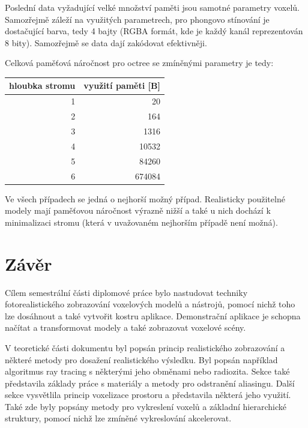 Poslední data vyžadující velké množství paměti jsou samotné parametry voxelů. Samozřejmě záleží na využitých parametrech, pro phongovo stínování je dostačující barva, tedy 4 bajty (RGBA formát, kde je každý kanál reprezentován 8 bity). Samozřejmě se data dají zakódovat efektivněji.

Celková paměťová náročnost pro octree se zmíněnými parametry je tedy:

\begin{table}[H]
\centering
\begin{tabular}{|r|r|}
\hline
\multicolumn{1}{|c|}{hloubka stromu} & \multicolumn{1}{c|}{využití paměti {[}B{]}} \\ \hline
1                                    & 20                                          \\ \hline
2                                    & 164                                         \\ \hline
3                                    & 1316                                        \\ \hline
4                                    & 10532                                       \\ \hline
5                                    & 84260                                       \\ \hline
6                                    & 674084                                      \\ \hline
\end{tabular}
\end{table}

Ve všech případech se jedná o nejhorší možný případ. Realisticky použitelné modely mají paměťovou náročnost výrazně nižší a také u nich dochází k minimalizaci stromu (která v uvažovaném nejhorším případě není možná).


\chapter{Závěr}
\label{zaver}
Cílem semestrální části diplomové práce bylo nastudovat techniky fotorealistického zobrazování voxelových modelů a nástrojů, pomocí nichž toho lze dosáhnout a také vytvořit kostru aplikace. Demonstrační aplikace je schopna načítat a transformovat modely a také zobrazovat voxelové scény.

V teoretické části dokumentu byl popsán princip realistického zobrazování a některé metody pro dosažení realistického výsledku. Byl popsán například algoritmus ray tracing s některými jeho obměnami nebo radiozita. Sekce také představila základy práce s materiály a metody pro odstranění aliasingu. Další sekce vysvětlila princip voxelizace prostoru a představila některá jeho využití. Také zde byly popsány metody pro vykreslení voxelů a základní hierarchické struktury, pomocí nichž lze zmíněné vykreslování akcelerovat.

